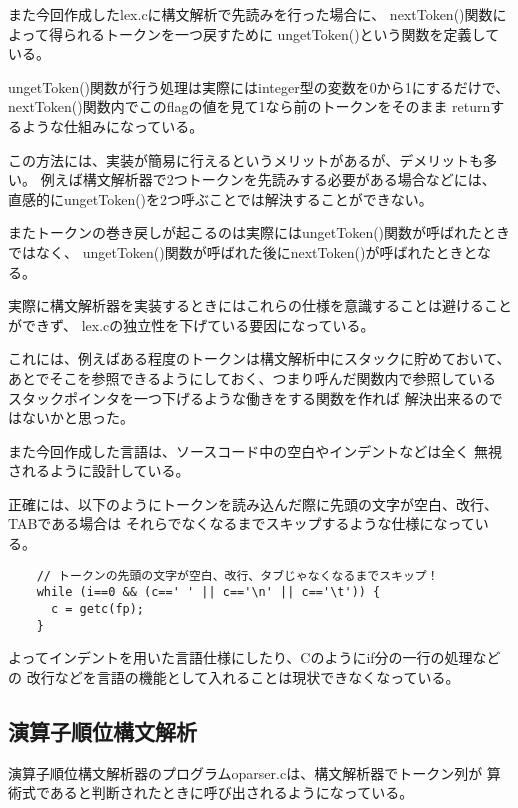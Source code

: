 \documentclass[11pt,a4j]{jarticle}
\begin{document}
また今回作成したlex.cに構文解析で先読みを行った場合に、
nextToken()関数によって得られるトークンを一つ戻すために
ungetToken()という関数を定義している。

ungetToken()関数が行う処理は実際にはinteger型の変数を0から1にするだけで、
nextToken()関数内でこのflagの値を見て1なら前のトークンをそのまま
returnするような仕組みになっている。

この方法には、実装が簡易に行えるというメリットがあるが、デメリットも多い。
例えば構文解析器で2つトークンを先読みする必要がある場合などには、
直感的にungetToken()を2つ呼ぶことでは解決することができない。

またトークンの巻き戻しが起こるのは実際にはungetToken()関数が呼ばれたときではなく、
ungetToken()関数が呼ばれた後にnextToken()が呼ばれたときとなる。

実際に構文解析器を実装するときにはこれらの仕様を意識することは避けることができず、
lex.cの独立性を下げている要因になっている。

これには、例えばある程度のトークンは構文解析中にスタックに貯めておいて、
あとでそこを参照できるようにしておく、つまり呼んだ関数内で参照している
スタックポインタを一つ下げるような働きをする関数を作れば
解決出来るのではないかと思った。

\vspace{0.2in}

また今回作成した言語は、ソースコード中の空白やインデントなどは全く
無視されるように設計している。

正確には、以下のようにトークンを読み込んだ際に先頭の文字が空白、改行、TABである場合は
それらでなくなるまでスキップするような仕様になっている。

\begin{verbatim}
    // トークンの先頭の文字が空白、改行、タブじゃなくなるまでスキップ！
    while (i==0 && (c==' ' || c=='\n' || c=='\t')) {
      c = getc(fp);
    }
\end{verbatim}

よってインデントを用いた言語仕様にしたり、Cのようにif分の一行の処理などの
改行などを言語の機能として入れることは現状できなくなっている。


\subsection{演算子順位構文解析}

演算子順位構文解析器のプログラムoparser.cは、構文解析器でトークン列が
算術式であると判断されたときに呼び出されるようになっている。
\end{document}
